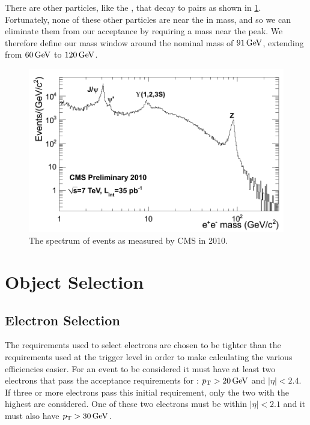 There are other particles, like the \jpsi, that decay to \ee pairs as shown in
\cref{fig:ee_spectrum}. Fortunately, none of these other particles are near
the \Z in mass, and so we can eliminate them from our acceptance by requiring a
mass near the \Z peak. We therefore define our mass window around the nominal
\Z mass of $91 \,\text{Ge\hspace{-.08em}V}$, extending from $60 \,\text{Ge\hspace{-.08em}V}$ to $120 \,\text{Ge\hspace{-.08em}V}$.

\begin{figure}[!htbp]
    \centering
    \includegraphics[width=\textwidth]{figures/dielectron_mass_7tev.png}
    \caption{
        The spectrum of \ee events as measured by CMS in 2010.
    }
    \label{fig:ee_spectrum}
\end{figure}

\section{Object Selection}

\subsection{Electron Selection}
\label{ssec:electron_selection}

The requirements used to select electrons are chosen to be tighter than the
requirements used at the trigger level in order to make calculating the various
efficiencies easier. For an event to be considered it must have at least two
electrons that pass the acceptance requirements for \ExtendedElectrons: $p_{\mathrm{T}} >
20 \,\text{Ge\hspace{-.08em}V}$ and $|\eta| < 2.4$. If three or more electrons pass this initial
requirement, only the two with the highest \pt are considered. One of these two
electrons must be within $|\eta| < 2.1$ and it must also have $p_{\mathrm{T}} > 30 \,\text{Ge\hspace{-.08em}V}$.

